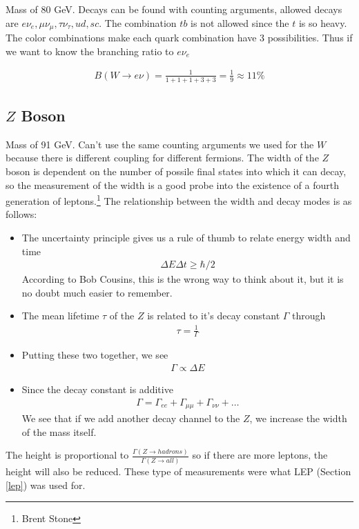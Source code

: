 Mass of 80 GeV. Decays can be found with counting arguments, allowed decays are $e\nu_e, \mu\nu_\mu,\tau\nu_\tau, ud, sc$. The combination $tb$ is not allowed since the $t$ is so heavy. The color combinations make each quark combination have 3 possibilities. Thus if we want to know the branching ratio to $e\nu_e$

\begin{align}
B(W\rightarrow e\nu) = \frac{1}{1+1+1+3+3} = \frac{1}{9}\approx 11\%
\end{align}

\subsection{$Z$ Boson}

Mass of 91 GeV. Can't use the same counting arguments we used for the $W$ because there is different coupling for different fermions. The width of the $Z$ boson is dependent on the number of possile final states into which it can decay, so the measurement of the width is a good probe into the existence of a fourth generation of leptons.\footnote{Brent Stone} The relationship between the width and decay modes is as follows:
\begin{itemize}
    \item The uncertainty principle gives us a rule of thumb to relate energy width and time
    \begin{align}
    \Delta E\Delta t\ge \hbar/2
    \end{align}
    According to Bob Cousins, this is the wrong way to think about it, but it is no doubt much easier to remember.
    \item The mean lifetime $\tau$ of the $Z$ is related to it's decay constant $\Gamma$ through
    \begin{align}
    \tau = \frac{1}{\Gamma}
    \end{align}
    \item Putting these two together, we see
    \begin{align}
    \Gamma \propto \Delta E
    \end{align}
    \item Since the decay constant is additive
    \begin{align}
    \Gamma = \Gamma_{ee} + \Gamma_{\mu\mu} + \Gamma_{\nu\nu} +  \ldots
    \end{align}
    We see that if we add another decay channel to the $Z$, we increase the width of the mass itself.
\end{itemize}
The height is proportional to $\frac{\Gamma(Z\rightarrow hadrons)}{\Gamma(Z\rightarrow all)}$ so if there are more leptons, the height will also be reduced. These type of measurements were what LEP (Section \ref{lep}) was used for.


